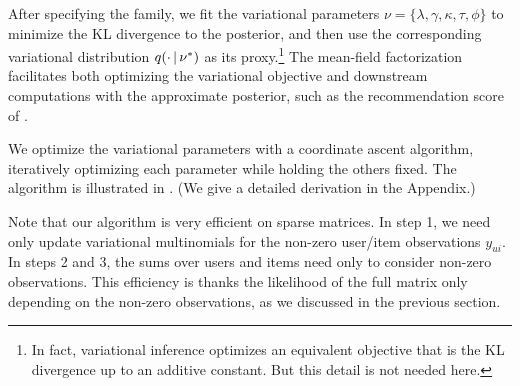 


After specifying the family, we fit the variational parameters $\nu =
\{\lambda, \gamma, \kappa, \tau, \phi\}$ to minimize the KL divergence
to the posterior, and then use the corresponding variational
distribution $q(\cdot \,\vert\, \nu^*)$ as its proxy.\footnote{In fact,
  variational inference optimizes an equivalent objective that is the
  KL divergence up to an additive constant.  But this detail is not
  needed here.}  The mean-field factorization facilitates both
optimizing the variational objective and downstream computations with
the approximate posterior, such as the recommendation score of
.


We optimize the variational parameters with a coordinate ascent
algorithm, iteratively optimizing each parameter while holding the
others fixed.  The algorithm is illustrated in .  (We
give a detailed derivation in the Appendix.)

Note that our algorithm is very efficient on sparse matrices. In step
1, we need only update variational multinomials for the non-zero
user/item observations $y_{ui}$.  In steps 2 and 3, the sums over
users and items need only to consider non-zero observations.  This
efficiency is thanks the likelihood of the full matrix only depending
on the non-zero observations, as we discussed in the previous section.



